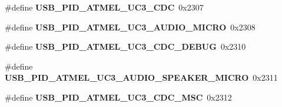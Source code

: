 \begin{DoxyCompactItemize}
\item 
\hypertarget{group__usb__atmel__ids__group_gac2efd8861d003f7b5933abbe604b7ea1}{\#define {\bfseries U\-S\-B\-\_\-\-P\-I\-D\-\_\-\-A\-T\-M\-E\-L\-\_\-\-U\-C3\-\_\-\-C\-D\-C}~0x2307}\label{group__usb__atmel__ids__group_gac2efd8861d003f7b5933abbe604b7ea1}

\item 
\hypertarget{group__usb__atmel__ids__group_ga02ed0d32e8e439ad888dbe84fadb8aaa}{\#define {\bfseries U\-S\-B\-\_\-\-P\-I\-D\-\_\-\-A\-T\-M\-E\-L\-\_\-\-U\-C3\-\_\-\-A\-U\-D\-I\-O\-\_\-\-M\-I\-C\-R\-O}~0x2308}\label{group__usb__atmel__ids__group_ga02ed0d32e8e439ad888dbe84fadb8aaa}

\item 
\hypertarget{group__usb__atmel__ids__group_gaa61c3875223bb266b9ad2c15e9bcd446}{\#define {\bfseries U\-S\-B\-\_\-\-P\-I\-D\-\_\-\-A\-T\-M\-E\-L\-\_\-\-U\-C3\-\_\-\-C\-D\-C\-\_\-\-D\-E\-B\-U\-G}~0x2310}\label{group__usb__atmel__ids__group_gaa61c3875223bb266b9ad2c15e9bcd446}

\item 
\hypertarget{group__usb__atmel__ids__group_ga010990fba35831f6098e8b612734540c}{\#define {\bfseries U\-S\-B\-\_\-\-P\-I\-D\-\_\-\-A\-T\-M\-E\-L\-\_\-\-U\-C3\-\_\-\-A\-U\-D\-I\-O\-\_\-\-S\-P\-E\-A\-K\-E\-R\-\_\-\-M\-I\-C\-R\-O}~0x2311}\label{group__usb__atmel__ids__group_ga010990fba35831f6098e8b612734540c}

\item 
\hypertarget{group__usb__atmel__ids__group_ga127317fe6fdf787d27384ea41b316353}{\#define {\bfseries U\-S\-B\-\_\-\-P\-I\-D\-\_\-\-A\-T\-M\-E\-L\-\_\-\-U\-C3\-\_\-\-C\-D\-C\-\_\-\-M\-S\-C}~0x2312}\label{group__usb__atmel__ids__group_ga127317fe6fdf787d27384ea41b316353}

\end{DoxyCompactItemize}
